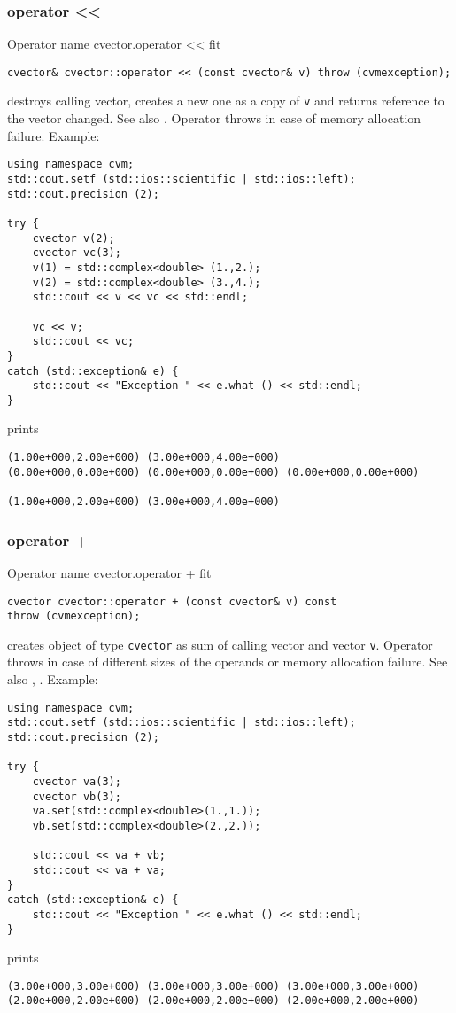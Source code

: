 \subsubsection{operator <{}<}
Operator%
\pdfdest name {cvector.operator <<} fit
\begin{verbatim}
cvector& cvector::operator << (const cvector& v) throw (cvmexception);
\end{verbatim}
destroys  calling vector, creates a new one as a copy of \verb"v"
and returns  reference to
the vector changed.
See also .
Operator throws  
in case of memory allocation failure.
Example:
\begin{Verbatim}
using namespace cvm;
std::cout.setf (std::ios::scientific | std::ios::left);
std::cout.precision (2);

try {
    cvector v(2);
    cvector vc(3);
    v(1) = std::complex<double> (1.,2.);
    v(2) = std::complex<double> (3.,4.);
    std::cout << v << vc << std::endl;

    vc << v;
    std::cout << vc;
}
catch (std::exception& e) {
    std::cout << "Exception " << e.what () << std::endl;
}
\end{Verbatim}
prints
\begin{Verbatim}
(1.00e+000,2.00e+000) (3.00e+000,4.00e+000)
(0.00e+000,0.00e+000) (0.00e+000,0.00e+000) (0.00e+000,0.00e+000)

(1.00e+000,2.00e+000) (3.00e+000,4.00e+000)
\end{Verbatim}
\newpage



\subsubsection{operator +}
Operator%
\pdfdest name {cvector.operator +} fit
\begin{verbatim}
cvector cvector::operator + (const cvector& v) const
throw (cvmexception);
\end{verbatim}
creates  object of type \verb"cvector" as  sum of
 calling vector and  vector \verb"v".
Operator throws 
in case of different sizes of the operands
or memory allocation failure.
See also , .
Example:
\begin{Verbatim}
using namespace cvm;
std::cout.setf (std::ios::scientific | std::ios::left);
std::cout.precision (2);

try {
    cvector va(3);
    cvector vb(3);
    va.set(std::complex<double>(1.,1.));
    vb.set(std::complex<double>(2.,2.));

    std::cout << va + vb;
    std::cout << va + va;
}
catch (std::exception& e) {
    std::cout << "Exception " << e.what () << std::endl;
}
\end{Verbatim}
prints
\begin{Verbatim}
(3.00e+000,3.00e+000) (3.00e+000,3.00e+000) (3.00e+000,3.00e+000)
(2.00e+000,2.00e+000) (2.00e+000,2.00e+000) (2.00e+000,2.00e+000)
\end{Verbatim}
\newpage


